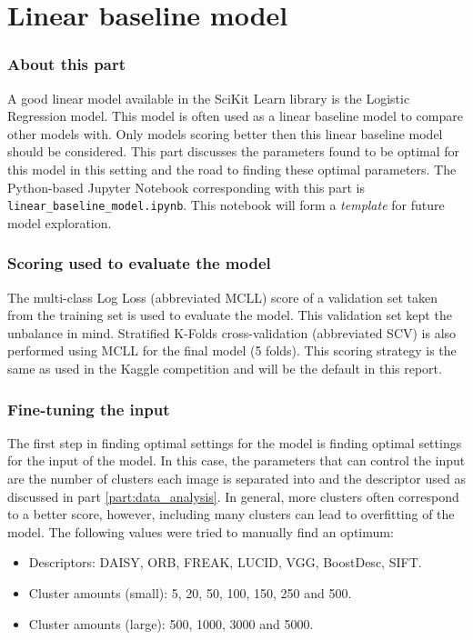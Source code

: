 \part{Linear baseline model}
\label{part:linear_baseline}


\section{About this part}
\label{section:LBM_about_part}
A good linear model available in the SciKit Learn library is the Logistic Regression model.
This model is often used as a linear baseline model to compare other models with.
Only models scoring better then this linear baseline model should be considered.
This part discusses the parameters found to be optimal for this model in this setting and the road to finding these optimal parameters.
The Python-based Jupyter Notebook corresponding with this part is \texttt{linear\_baseline\_model.ipynb}.
This notebook will form a \emph{template} for future model exploration.


\section{Scoring used to evaluate the model}
\label{section:LBM_scoring_used}

The multi-class Log Loss (abbreviated MCLL) score of a validation set taken from the training set is used to evaluate the model.
This validation set kept the unbalance in mind.
Stratified K-Folds cross-validation (abbreviated SCV) is also performed using MCLL for the final model (5 folds).
This scoring strategy is the same as used in the Kaggle competition and will be the default in this report.


\section{Fine-tuning the input}
\label{section:LBM_finetuning_clusters}
The first step in finding optimal settings for the model is finding optimal settings for the input of the model.
In this case, the parameters that can control the input are the number of clusters each image is separated into and the descriptor used as discussed in part \ref{part:data_analysis}.
In general, more clusters often correspond to a better score, however, including many clusters can lead to overfitting of the model.
The following values were tried to manually find an optimum:
\begin{itemize}
    \item Descriptors: DAISY, ORB, FREAK, LUCID, VGG, BoostDesc, SIFT.
    \item Cluster amounts (small): 5, 20, 50, 100, 150, 250 and 500.
    \item Cluster amounts (large): 500, 1000, 3000 and 5000.
\end{itemize}

